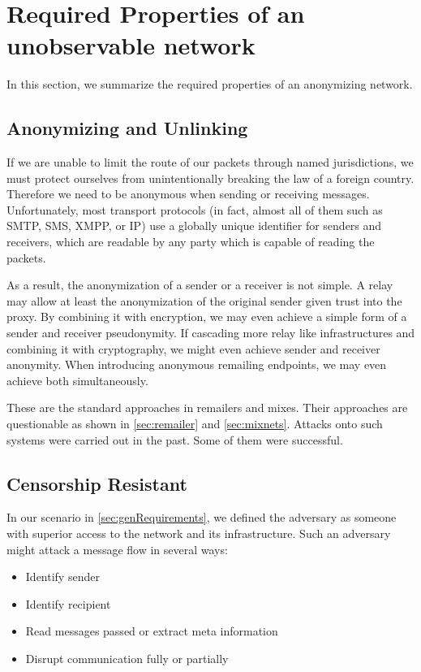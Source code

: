 \section{Required Properties of an unobservable network}
In this section, we summarize the required properties of an anonymizing network.

\subsection{Anonymizing and Unlinking}
If we are unable to limit the route of our packets through named jurisdictions, we must protect ourselves from unintentionally breaking the law of a foreign country. Therefore we need to be anonymous when sending or receiving messages. Unfortunately, most transport protocols (in fact, almost all of them such as SMTP, SMS, XMPP, or IP) use a globally unique identifier for senders and receivers, which are readable by any party which is capable of reading the packets. 

As a result, the anonymization of a sender or a receiver is not simple. A relay may allow at least the anonymization of the original sender given trust into the proxy. By combining it with encryption, we may even achieve a simple form of a sender and receiver pseudonymity. If cascading more relay like infrastructures and combining it with cryptography, we might even achieve sender and receiver anonymity. When introducing anonymous remailing endpoints, we may even achieve both simultaneously.

These are the standard approaches in remailers and mixes. Their approaches are questionable as shown in \ref{sec:remailer} and \ref{sec:mixnets}. Attacks onto such systems were carried out in the past. Some of them were successful.

\subsection{Censorship Resistant}
In our scenario in \ref{sec:genRequirements}, we defined the adversary as someone with superior access to the network and its infrastructure. Such an adversary might attack a message flow in several ways:
\begin{itemize}
	\item Identify sender
	\item Identify recipient
	\item Read messages passed or extract meta information
	\item Disrupt communication fully or partially
\end{itemize}

